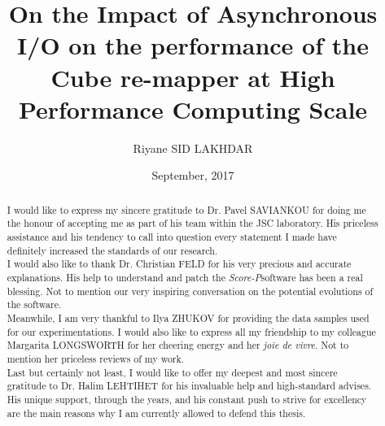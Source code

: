 \documentclass[12pt, a4paper]{memoir}	%
\title{On the Impact of Asynchronous I/O on the performance of the Cube re-mapper at High Performance Computing Scale} %
\author{Riyane SID LAKHDAR}
\date{September, 2017} %
\newcommand{\toolProfiling}					{\emph{Score-P}}
\begin{document}

\frontmatter
\begin{titlingpage}
\maketitle
\end{titlingpage}

\setlength{\parskip}{-1pt plus 1pt}

\renewcommand{\abstracttextfont}{\normalfont}
\abstractintoc

\renewcommand\abstractname{R\'esum\'e}

\abstractintoc

\renewcommand\abstractname{Acknowledgement}
\begin{abstract}
I would like to express my sincere gratitude to Dr. Pavel SAVIANKOU for doing me the honour of accepting me as part of his team within the JSC laboratory.   His priceless assistance and his tendency to call into question every statement I made have definitely increased the standards of our research.\\

I would also like to thank Dr. Christian FELD for his very precious and accurate explanations.   His help to understand and patch the \toolProfiling\space software has been a real blessing.   Not to mention our very inspiring conversation on the potential evolutions of the software.\\

Meanwhile, I am very thankful to Ilya ZHUKOV for providing the data samples used for our experimentations.   I would also like to express all my friendship to my colleague Margarita LONGSWORTH for her cheering energy and her \emph{joie de vivre}.   Not to mention her priceless reviews of my work.\\

Last but certainly not least, I would like to offer my deepest and most sincere gratitude to Dr. Halim LEHTIHET for his invaluable help and high-standard advises.   His unique support, through the years, and his constant push to strive for excellency are the main reasons why I am currently allowed to defend this thesis.
\end{abstract}



\cleardoublepage

\tableofcontents* %
\newpage
\listoffigures*
\end{document}
